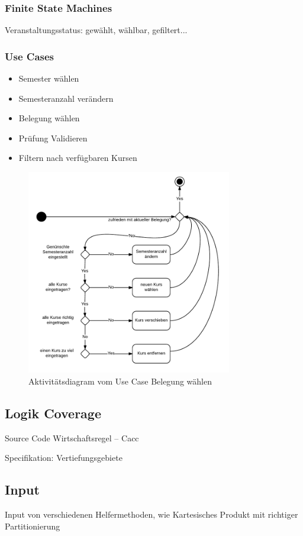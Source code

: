 \documentclass[ngerman]{article}
\begin{document}
\subsubsection{Finite State Machines}
Veranstaltungsstatus: gewählt, wählbar, gefiltert...


\subsubsection{Use Cases}

\begin{itemize}
\item Semester wählen
\item Semesteranzahl verändern
\item Belegung wählen
\item Prüfung Validieren
\item Filtern nach verfügbaren Kursen
\end{itemize}

\begin{figure}

\includegraphics[width=0.8\textwidth]{figures/180_Belegungaendern_aktivitaet.pdf}
\caption{Aktivitätsdiagram vom Use Case Belegung wählen}
\end{figure}

\subsection{Logik Coverage}
Source Code
Wirtschaftsregel -- Cacc

Specifikation: Vertiefungsgebiete 


\subsection{Input}
Input von verschiedenen Helfermethoden, wie Kartesisches Produkt mit richtiger Partitionierung
\end{document}
